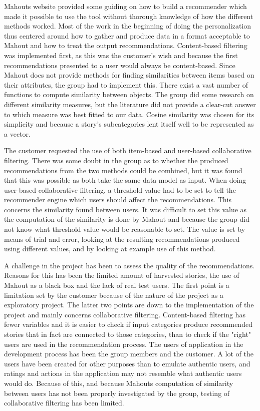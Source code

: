 Mahouts website provided some guiding on how to build a recommender which made it possible to use the tool without thorough knowledge of how the different methods worked. Most of the work in the beginning of doing the personalization thus centered around how to gather and produce data in a format acceptable to Mahout and how to treat the output recommendations. Content-based filtering was implemented first, as this was the customer's wish and because the first recommendations presented to a user would always be content-based. Since Mahout does not provide methods for finding similarities between items based on their attributes, the group had to implement this. There exist a vast number of functions to compute similarity between objects. The group did some research on different similarity measures, but the literature did not provide a clear-cut answer to which measure was best fitted to our data. Cosine similarity was chosen for its simplicity and because a story's subcategories lent itself well to be represented as a vector.\newline

The customer requested the use of both item-based and user-based collaborative filtering. There was some doubt in the group as to whether the produced recommendations from the two methods could be combined, but it was found that this was possible as both take the same data model as input. When doing user-based collaborative filtering, a threshold value had to be set to tell the recommender engine which users should affect the recommendations. This concerns the similarity found between users. It was difficult to set this value as the computation of the similarity is done by Mahout and because the group did not know what threshold value would be reasonable to set. The value is set by means of trial and error, looking at the resulting recommendations produced using different values, and by looking at example use of this method. \newline

A challenge in the project has been to assess the quality of the recommendations. Reasons for this has been the limited amount of harvested stories, the use of Mahout as a black box and the lack of real test users. The first point is a limitation set by the customer because of the nature of the project as a exploratory project. The latter two points are down to the implementation of the project and mainly concerns collaborative filtering. Content-based filtering has fewer variables and it is easier to check if input categories produce recommended stories that in fact are connected to those categories, than to check if the "right" users are used in the recommendation process. The users of application in the development process has been the group members and the customer. A lot of the users have been created for other purposes than to emulate authentic users, and ratings and actions in the application may not resemble what authentic users would do. Because of this, and because Mahouts computation of similarity between users has not been properly investigated by the group, testing of collaborative filtering has been limited. \newline  

